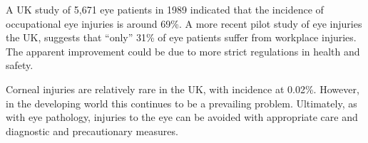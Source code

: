 A UK study of 5,671 eye patients in 1989 indicated that the incidence of
occupational eye injuries is around 69\%.\cite{macewen1989eye} A more
recent pilot study of eye injuries the UK, suggests that \enquote{only} 31\%
of eye patients suffer from workplace injuries.\cite{thompson2009occupational}
The apparent improvement could be due to more strict regulations in health
and safety.

Corneal injuries are relatively rare in the UK, with incidence at
0.02\%.\cite{macdonald2009surveillance} However, in the developing
world this continues to be a prevailing problem.\cite{whitcher2001corneal}
Ultimately, as with eye pathology, injuries to the eye can be avoided with
appropriate care and diagnostic and precautionary measures.

